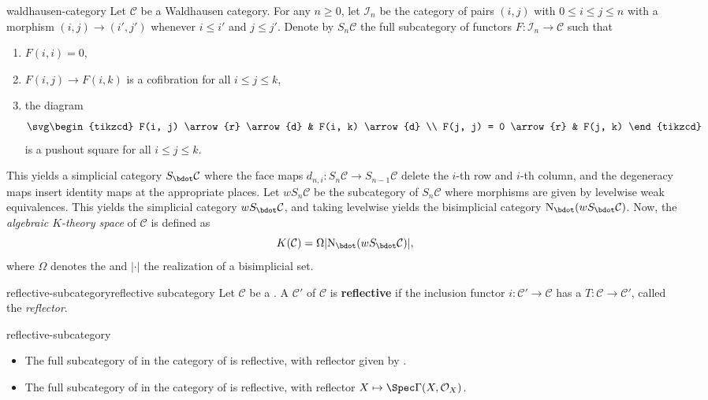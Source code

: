 \begin{example}{waldhausen-category}
    Let $\mathcal{C}$ be a Waldhausen category. For any $n \ge 0$, let $\mathcal{I}_n$ be the category of pairs $(i, j)$ with $0 \le i \le j \le n$ with a morphism $(i, j) \to (i', j')$ whenever $i \le i'$ and $j \le j'$. Denote by $S_n \mathcal{C}$ the full subcategory of functors $F : \mathcal{I}_n \to \mathcal{C}$ such that
    \begin{enumerate}[label=(\roman*)]
        \item $F(i, i) = 0$,
        \item $F(i, j) \to F(i, k)$ is a cofibration for all $i \le j \le k$,
        \item the diagram
        \[ \svg \begin{tikzcd} F(i, j) \arrow{r} \arrow{d} & F(i, k) \arrow{d} \\ F(j, j) = 0 \arrow{r} & F(j, k) \end{tikzcd} \]
        is a pushout square for all $i \le j \le k$.
    \end{enumerate}
    This yields a simplicial category $S_\bdot \mathcal{C}$ where the face maps $d_{n, i} : S_n \mathcal{C} \to S_{n - 1} \mathcal{C}$ delete the $i$-th row and $i$-th column, and the degeneracy maps insert identity maps at the appropriate places. Let $w S_n \mathcal{C}$ be the subcategory of $S_n \mathcal{C}$ where morphisms are given by levelwise weak equivalences. This yields the simplicial category $w S_\bdot \mathcal{C}$, and taking levelwise  yields the bisimplicial category $\textup{N}_\bdot(w S_\bdot \mathcal{C})$. Now, the \textit{algebraic $K$-theory space} of $\mathcal{C}$ is defined as
    \[ K(\mathcal{C}) = \Omega |\textup{N}_\bdot(w S_\bdot \mathcal{C})| , \]
    where $\Omega$ denotes the  and $|\cdot|$ the realization of a bisimplicial set.
\end{example}

\begin{topic}{reflective-subcategory}{reflective subcategory}
    Let $\mathcal{C}$ be a . A  $\mathcal{C}'$ of $\mathcal{C}$ is \textbf{reflective} if the inclusion functor $i : \mathcal{C}' \to \mathcal{C}$ has a  $T : \mathcal{C} \to \mathcal{C}'$, called the \textit{reflector}.
\end{topic}

\begin{example}{reflective-subcategory}
    \begin{itemize}
        \item The full subcategory of  in the category of  is reflective, with reflector given by .
        \item The full subcategory of  in the category of  is reflective, with reflector $X \mapsto \Spec \Gamma(X, \mathcal{O}_X)$.
    \end{itemize}
\end{example}
